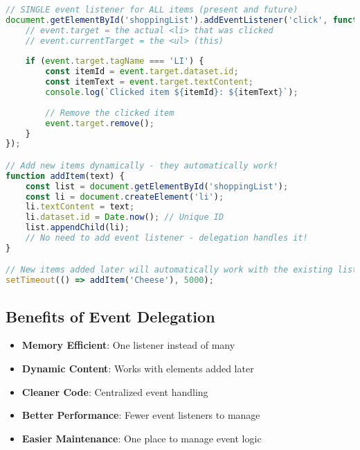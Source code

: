 \documentclass{article.cls}
\begin{document}
    \begin{lstlisting}[language=JavaScript, caption=Event Delegation Implementation]
// SINGLE event listener for ALL items (present and future)
document.getElementById('shoppingList').addEventListener('click', function(event) {
    // event.target = the actual <li> that was clicked
    // event.currentTarget = the <ul> (this)
    
    if (event.target.tagName === 'LI') {
        const itemId = event.target.dataset.id;
        const itemText = event.target.textContent;
        console.log(`Clicked item ${itemId}: ${itemText}`);
        
        // Remove the clicked item
        event.target.remove();
    }
});

// Add new items dynamically - they automatically work!
function addItem(text) {
    const list = document.getElementById('shoppingList');
    const li = document.createElement('li');
    li.textContent = text;
    li.dataset.id = Date.now(); // Unique ID
    list.appendChild(li);
    // No need to add event listener - delegation handles it!
}

// New items added later will automatically work with the existing listener
setTimeout(() => addItem('Cheese'), 5000);
    \end{lstlisting}

    \subsection*{Benefits of Event Delegation}

    \begin{itemize}
        \item \textbf{Memory Efficient}: One listener instead of many
        \item \textbf{Dynamic Content}: Works with elements added later
        \item \textbf{Cleaner Code}: Centralized event handling
        \item \textbf{Better Performance}: Fewer event listeners to manage
        \item \textbf{Easier Maintenance}: One place to manage event logic
    \end{itemize}
\end{document}
